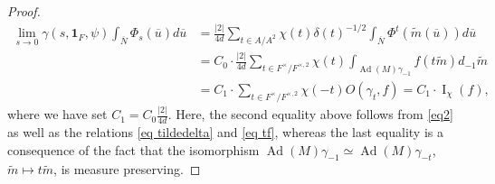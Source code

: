\documentclass[10pt,a4paper]{amsart}
\DeclareMathOperator{\Ad}{Ad}
\def\oN{\overline{N}}
\def\ou{\overline{u}}
\DeclareMathOperator{\rI}{\mathrm{I}}
\def\tm{\widetilde{m}}
\begin{document}
\begin{proof}
		\[\begin{aligned}
			\displaystyle \lim\limits_{s\to 0} \gamma(s,\mathbf{1}_F,\psi)\int_{\oN} \Phi_s(\ou)d\ou & = \frac{\lvert 2\rvert}{4d}\sum_{t\in A/A^2} \chi(t) \delta(t)^{-1/2} \int_{\oN} \Phi^t(\tm(\ou)) d\ou \\
			& = C_0\cdot \frac{\lvert 2\rvert}{4d} \sum_{t\in F^\times/F^{\times,2}} \chi(t) \int_{\Ad(M)\gamma_{-1}} f(t \tm) d_{-1}\tm \\
			& = C_1\cdot \sum_{t\in F^\times/F^{\times,2}} \chi(-t) O(\gamma_t,f)=C_1 \cdot \rI_{\chi}(f),
		\end{aligned}\]
		where we have set $C_1= C_0\frac{\lvert 2\rvert}{4d} $. Here, the second equality above follows from \eqref{eq2} as well as the relations \eqref{eq tildedelta} and \eqref{eq tf}, whereas the last equality is a consequence of the fact that the isomorphism $\Ad(M)\gamma_{-1}\simeq \Ad(M)\gamma_{-t}$, $\tm\mapsto t\tm$, is measure preserving.
	\end{proof}
\end{document}
